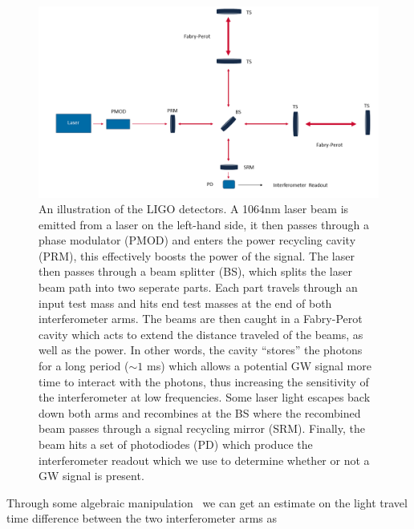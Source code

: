 \begin{figure}
    \centering
    \includegraphics[width=\linewidth]{figures/Interferometer_sketch_figure.png}
    \caption[Illustration of the \ac{LIGO} detectors.]{An illustration of the \ac{LIGO} detectors. A 1064nm laser beam is emitted from a laser on the left-hand side, it then passes through a phase modulator (PMOD) and enters the power recycling cavity (PRM), this effectively boosts the power of the signal. The laser then passes through a beam splitter (BS), which splits the laser beam path into two seperate parts. Each part travels through an input test mass and hits end test masses at the end of both interferometer arms. The beams are then caught in a Fabry-Perot cavity which acts to extend the distance traveled of the beams, as well as the power. In other words, the cavity ``stores'' the photons for a long period ($\sim1$ ms) which allows a potential \ac{GW} signal more time to interact with the photons, thus increasing the sensitivity of the interferometer at low frequencies. Some laser light escapes back down both arms and recombines at the BS where the recombined beam passes through a signal recycling mirror (SRM). Finally, the beam hits a set of photodiodes (PD) which produce the interferometer readout which we use to determine whether or not a \ac{GW} signal is present.~}
    \label{fig:gw_plus_cross}
\end{figure}


Through some algebraic manipulation~ we can get an estimate on the 
light travel time difference between the two interferometer 
arms as 

